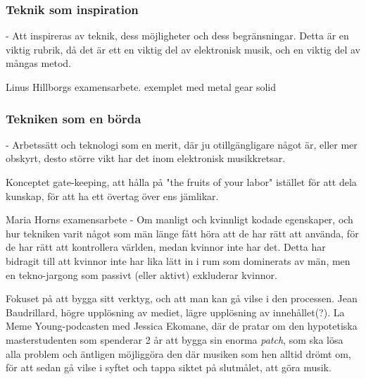 \documentclass{article}
\begin{document}


\subsubsection{Teknik som inspiration}
- Att inspireras av teknik, dess möjligheter och dess begränsningar. Detta är en viktig rubrik, då det är ett
  en viktig del av elektronisk musik, och en viktig del av mångas metod. 

  Linus Hillborgs examensarbete. exemplet med metal gear solid

\subsubsection{Tekniken som en börda}
- Arbetssätt och teknologi som en merit, där ju otillgängligare något är, eller mer obskyrt, desto större vikt
  har det inom elektronisk musikkretsar. 

  Konceptet gate-keeping, att hålla på "the fruits of your labor" istället för att dela kunskap, för att ha
  ett övertag över ens jämlikar.

  Maria Horns examensarbete - Om manligt och kvinnligt kodade egenskaper, och hur tekniken varit något som män
  länge fått höra att de har rätt att använda, för de har rätt att kontrollera världen, medan kvinnor inte har
  det. Detta har bidragit till att kvinnor inte har lika lätt in i rum som dominerats av män, men en
  tekno-jargong som passivt (eller aktivt) exkluderar kvinnor. 

  Fokuset på att bygga sitt verktyg, och att man kan gå vilse i den processen. Jean Baudrillard, högre
  upplösning av mediet, lägre upplösning av innehållet(?). 
  La Meme Young-podcasten med Jessica Ekomane, där de pratar om den hypotetiska masterstudenten som spenderar
  2 år att bygga sin enorma \emph{patch}, som ska lösa alla problem och äntligen möjliggöra den där musiken
  som hen alltid drömt om, för att sedan gå vilse i syftet och tappa siktet på slutmålet, att göra musik. 

\end{document}
